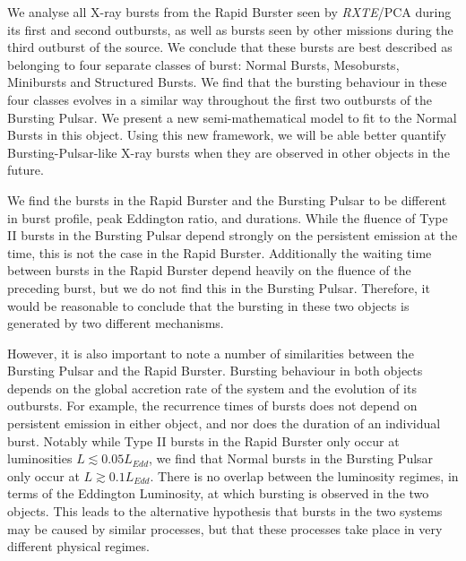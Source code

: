 \par We analyse all X-ray bursts from the Rapid Burster seen by \textit{RXTE}/PCA during its first and second outbursts, as well as bursts seen by other missions during the third outburst of the source.  We conclude that these bursts are best described as belonging to four separate classes of burst: Normal Bursts, Mesobursts, Minibursts and Structured Bursts.  We find that the bursting behaviour in these four classes evolves in a similar way throughout the first two outbursts of the Bursting Pulsar.  We present a new semi-mathematical model to fit to the Normal Bursts in this object.  Using this new framework, we will be able better quantify Bursting-Pulsar-like X-ray bursts when they are observed in other objects in the future.
\par We find the bursts in the Rapid Burster and the Bursting Pulsar to be different in burst profile, peak Eddington ratio, and durations.  While the fluence of Type II bursts in the Bursting Pulsar depend strongly on the persistent emission at the time, this is not the case in the Rapid Burster.  Additionally the waiting time between bursts in the Rapid Burster depend heavily on the fluence of the preceding burst, but we do not find this in the Bursting Pulsar.  Therefore, it would be reasonable to conclude that the bursting in these two objects is generated by two different mechanisms.
\par However, it is also important to note a number of similarities between the Bursting Pulsar and the Rapid Burster.  Bursting behaviour in both objects depends on the global accretion rate of the system and the evolution of its outbursts.  For example, the recurrence times of bursts does not depend on persistent emission in either object, and nor does the duration of an individual burst.  Notably while Type II bursts in the Rapid Burster only occur at luminosities $L\lesssim0.05L_{Edd}$, we find that Normal bursts in the Bursting Pulsar only occur at $L\gtrsim0.1L_{Edd}$.  There is no overlap between the luminosity regimes, in terms of the Eddington Luminosity, at which bursting is observed in the two objects.  This leads to the alternative hypothesis that bursts in the two systems may be caused by similar processes, but that these processes take place in very different physical regimes.